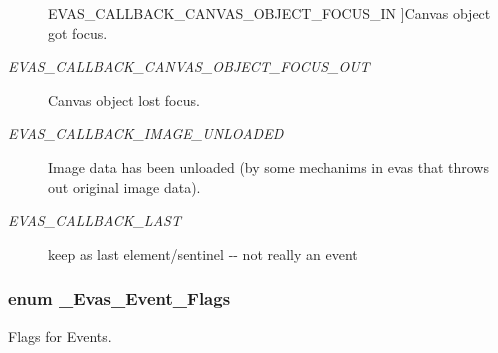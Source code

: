 \begin{Desc}
\begin{description}
{EVAS\_\-CALLBACK\_\-CANVAS\_\-OBJECT\_\-FOCUS\_\-IN\label{Evas_8h_a99e208e463a20499aabe6faac8a8cb8aa7380ca16bf87762e96309473d3d306c5}
}]Canvas object got focus. \item[{\em 
EVAS\_\-CALLBACK\_\-CANVAS\_\-OBJECT\_\-FOCUS\_\-OUT\label{Evas_8h_a99e208e463a20499aabe6faac8a8cb8aa974f3364f1cee80e98bc5ff3e01d3070}
}]Canvas object lost focus. \item[{\em 
EVAS\_\-CALLBACK\_\-IMAGE\_\-UNLOADED\label{Evas_8h_a99e208e463a20499aabe6faac8a8cb8aaf0a0bdf43416c9c2a80dab7d052ac3f8}
}]Image data has been unloaded (by some mechanims in evas that throws out original image data). \item[{\em 
EVAS\_\-CALLBACK\_\-LAST\label{Evas_8h_a99e208e463a20499aabe6faac8a8cb8aab36d452d3fcb36aa19becaf700bde529}
}]keep as last element/sentinel -\/-\/ not really an event \end{description}
\end{Desc}

\subsubsection[{\_\-Evas\_\-Event\_\-Flags}]{\setlength{\rightskip}{0pt plus 5cm}enum {\bf \_\-Evas\_\-Event\_\-Flags}}\label{Evas_8h_a89ffbc5f4d2796994c8b07ef95ef3d1a}


Flags for Events. 


